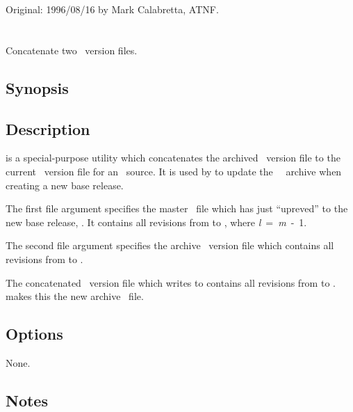 Original: 1996/08/16 by Mark Calabretta, ATNF.

 
\newpage
\section{}
\label{rcscat}
 
Concatenate two \rcs\ version files.

\subsection*{Synopsis}
 
\begin{synopsis}
\end{synopsis}
 
\subsection*{Description}
 
 is a special-purpose utility which concatenates the archived
\rcs\ version file to the current \rcs\ version file for an \aipspp\ source.
It is used by  to update the \aipspp\ \rcs\ archive when
creating a new base release.

The first file argument specifies the master \rcs\ file which 
has just ``upreved'' to the new base release, .  It
contains all revisions from  to ,
where \textit{l}~=~\textit{m}~-~1.

The second file argument specifies the archive \rcs\ version file which
contains all revisions from  to .  

The concatenated \rcs\ version file which  writes to 
contains all revisions from  to .
 makes this the new archive \rcs\ file.
 
\subsection*{Options}
 
None.

\subsection*{Notes}
 
